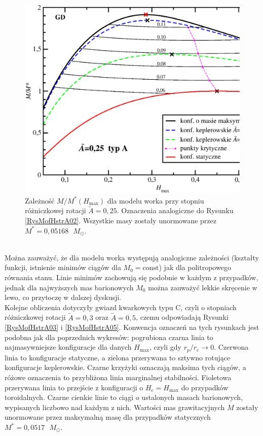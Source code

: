 \documentclass{bachelor_thesis}
\begin{document}
            \begin{figure}[h!]
            \centering
            \includegraphics[scale=.47]{figures/RysMofHstrA025.eps}
            \caption{Zależność $M/M^*(H_\textrm{max})$ dla modelu worka przy stopniu różniczkowej rotacji $\tilde{A}=0,25$. Oznaczenia analogiczne do Rysunku \ref{RysMofHstrA02}. Wszystkie masy zostały unormowane przez $M^*=0,05168\textrm{ }M_\odot$.}
            \label{RysMofHstrA025}
            \end{figure}\\
            \indent Można zauważyć, że dla modelu worka występują analogiczne zależności (kształty funkcji, istnienie minimów ciągów dla $M_0=\textrm{const}$) jak dla politropowego równania stanu. Linie minimów zachowują się podobnie w każdym z przypadków, jednak dla najwyższych mas barionowych $M_0$ można zauważyć lekkie skręcenie w lewo, co przytoczę w dalszej dyskusji.\\
            \indent Kolejne obliczenia dotyczyły gwiazd kwarkowych typu C, czyli o stopniach różniczkowej rotacji $\tilde{A}=0,3$ oraz $\tilde{A}=0,5$, czemu odpowiadają Rysunki \ref{RysMofHstrA03} i \ref{RysMofHstrA05}. Konwencja oznaczeń na tych rysunkach jest podobna jak dla poprzednich wykresów: pogrubiona czarna linia to najmasywniejsze konfiguracje dla danych $H_\textrm{max}$, czyli gdy $r_p/r_e\rightarrow 0$. Czerwona linia to konfiguracje statyczne, a zielona przerywana to sztywno rotujące konfiguracje keplerowskie. Czarne krzyżyki oznaczają maksima tych ciągów, a różowe oznaczenia to przybliżona linia marginalnej stabilności. Fioletowa przerywana linia to przejście z konfiguracji o $H_\textrm{c}=H_\textrm{max}$ do przypadków toroidalnych. Czarne cienkie linie to ciągi o ustalonych masach barionowych, wypisanych liczbowo nad każdym z nich. Wartości mas grawitacyjnych $M$ zostały unormowane przez maksymalną masę dla przypadków statycznych $M^*=0,0517\textrm{ }M_\odot$.
\end{document}
